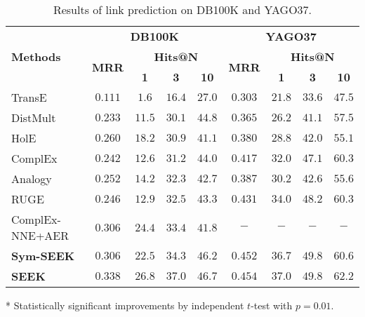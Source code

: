 \documentclass[11pt,a4paper]{article}
\newcommand{\Outperform}[1]{\mathbf{#1}}
\newcommand{\TableSize}{\footnotesize} \renewcommand{\thefootnote}{\fnsymbol{footnote}}
\begin{document}
\begin{table*}[!h]
	\centering
	\begin{threeparttable}
		
		\TableSize
		\begin{tabular}{ l |c  c  c  c | c  c  c  c}
			\toprule
			\multirow{3}{*}{\textbf{Methods}} & \multicolumn{4}{c|}{\textbf{DB100K}} &  \multicolumn{4}{c}{\textbf{YAGO37}} \\
			\cmidrule{2-9}
			& \multirow{2}{*}{\textbf{MRR}}  &  \multicolumn{3}{c|}{\textbf{Hits@N}} & \multirow{2}{*}{\textbf{MRR}}  &  \multicolumn{3}{c}{\textbf{Hits@N}} \\ 
			\cmidrule{3-5}	\cmidrule{7-9}
			&  & \textbf{1} & \textbf{3} & \textbf{10} & & \textbf{1} & \textbf{3} & \textbf{10}  \\ 
			\midrule
			TransE~\cite{bordes2013translating}& $0.111$ & $1.6$ & $16.4$ & $27.0$ & $0.303$ & $21.8$ & $33.6$ & $47.5$   \\
			DistMult~\cite{yang2015embedding}& $0.233$ & $11.5$ & $30.1$ & $44.8$ & $0.365$ & $26.2$ & $41.1$ & $57.5$ \\
			HolE~\cite{nickel2016holographic} & $0.260$ & $18.2$ & $30.9$ & $41.1$ &  $0.380$ & $28.8$ & $42.0$ & $55.1$  \\
			ComplEx~\cite{trouillon2016complex}& $0.242$ & $12.6$ & $31.2$ & $44.0$  & $0.417$ & $32.0$ & $47.1$ & $60.3$ \\		
			Analogy~\cite{liu2017analogical} & $0.252$ & $14.2$ & $32.3$ & $42.7$ & $0.387$ & $30.2$ & $42.6$ & $55.6$ \\
			\midrule
			RUGE~\cite{guo2018:RUGE}& $0.246$ & $12.9$ & $32.5$ & $43.3$ &$0.431$ & $34.0$ & $48.2$ & $60.3$ \\
			ComplEx-NNE+AER~\cite{boyang2018:aer} & $0.306$ & $24.4$ & $33.4$ & $41.8$ & $-$ & $-$ & $-$ & $-$ \\
			\midrule
			\textbf{Sym-SEEK}\tnote{*} & $0.306$ &  $22.5$ & $34.3$ & $46.2$ &$0.452$ &  $36.7$ & $\Outperform{49.8}$ & $60.6$ \\
			\textbf{SEEK}\tnote{*} & $\Outperform{0.338}$ &  $\Outperform{26.8}$ & $\Outperform{37.0}$ & $\Outperform{46.7}$ &$\Outperform{0.454}$ &  $\Outperform{37.0}$ & $\Outperform{49.8}$ & $\Outperform{62.2}$ \\
			\bottomrule
		\end{tabular}
		\begin{tablenotes}
			\item[*] Statistically significant improvements by independent $t$-test with $p = 0.01$.
		\end{tablenotes}
		
	\end{threeparttable}
	\caption{Results of link prediction on DB100K and YAGO37.}
	\label{tab:kbc-performance-yago37-db100k}
\end{table*}
\end{document}

